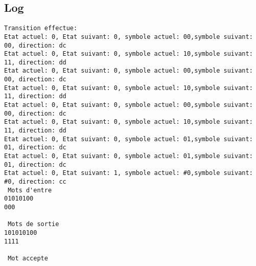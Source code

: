 \documentclass{article}
\begin{document}
\subsection{Log}
\begin{verbatim}
Transition effectue:
Etat actuel: 0, Etat suivant: 0, symbole actuel: 00,symbole suivant: 00, direction: dc 
Etat actuel: 0, Etat suivant: 0, symbole actuel: 10,symbole suivant: 11, direction: dd 
Etat actuel: 0, Etat suivant: 0, symbole actuel: 00,symbole suivant: 00, direction: dc 
Etat actuel: 0, Etat suivant: 0, symbole actuel: 10,symbole suivant: 11, direction: dd 
Etat actuel: 0, Etat suivant: 0, symbole actuel: 00,symbole suivant: 00, direction: dc 
Etat actuel: 0, Etat suivant: 0, symbole actuel: 10,symbole suivant: 11, direction: dd 
Etat actuel: 0, Etat suivant: 0, symbole actuel: 01,symbole suivant: 01, direction: dc 
Etat actuel: 0, Etat suivant: 0, symbole actuel: 01,symbole suivant: 01, direction: dc 
Etat actuel: 0, Etat suivant: 1, symbole actuel: #0,symbole suivant: #0, direction: cc 
 Mots d'entre 
01010100
000

 Mots de sortie 
101010100
1111

 Mot accepte 
\end{verbatim}
\end{document}
